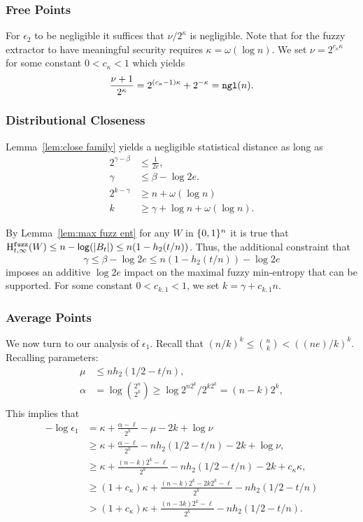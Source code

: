 \subsubsection{Free Points}
For $\epsilon_2$ to be negligible it suffices that $\nu/2^\kappa$ is negligible.  Note that for the fuzzy extractor to have meaningful security requires $\kappa = \omega(\log{n})$.  We set $\nu = 2^{c_{\kappa}\kappa}$ for some constant $0 < c_{\kappa}<1$ which yields 
\[
\frac{\nu+1}{2^\kappa} = 2^{(c_{\kappa}-1)\kappa}+ 2^{-\kappa} = \mathtt{ngl}(n).
\]
\subsubsection{Distributional Closeness}
 Lemma~\ref{lem:close family} yields a negligible statistical distance as long as 
\begin{align*}
2^{\gamma - \beta} &\le \frac{1}{2e},\\
 \gamma &\le \beta -\log{2e}.\\
2^{k-\gamma}&\ge n+\omega(\log n)\\
k &\ge \gamma + \log{n+ \omega(\log{n})}.
\end{align*}


By Lemma~\ref{lem:max fuzz ent} for any $W$ in $\{0, 1\}^n$ it is true that $\mathrm{H}^{\mathtt{fuzz}}_{t,\infty}(W) \le n -\mathsf{log}\!\left(|B_t|\right) \le n(1-h_2(t/n))$.  Thus, the additional constraint that 
\[
\gamma \le \beta - \log{2e}
\le n(1-h_2(t/n)) - \log{2e}\] imposes an additive $\log{2e}$ impact on the maximal fuzzy min-entropy that can be supported. 
For some constant $0<c_{k,1} < 1$, we set $k = \gamma + c_{k,1}n$. 

\subsubsection{Average Points} 
We now turn to our analysis of $\epsilon_1$.  Recall that $(n/k)^k \le {n\choose k} < ((ne)/k)^k$.  Recalling parameters: 
\begin{align*}
\mu&\le nh_2(1/2-t/n),\\
\alpha &= \log{2^n\choose 2^k} \ge \log{2^{n2^k} /2^{k2^k}} = (n-k)2^k,\\
\end{align*}
This implies that 
\begin{align*}
-\log{\epsilon_1}&= \kappa+\frac{\alpha-\ell}{2^k} - \mu -2k+\log{\nu}\\
&\ge  \kappa+\frac{\alpha -\ell}{2^k} - nh_2(1/2-t/n) - 2k+\log{\nu},\\
&\ge  \kappa+\frac{(n-k)2^k-\ell}{2^k} - nh_2(1/2-t/n) - 2k+c_{\kappa}\kappa,\\
&\ge  (1+c_{\kappa})\kappa+\frac{(n-k)2^k-2k2^{k}-\ell}{2^k} - nh_2(1/2-t/n)\\
&>  (1+c_{\kappa})\kappa+\frac{(n-3k)2^k-\ell}{2^k} - nh_2(1/2-t/n) .
\end{align*}

